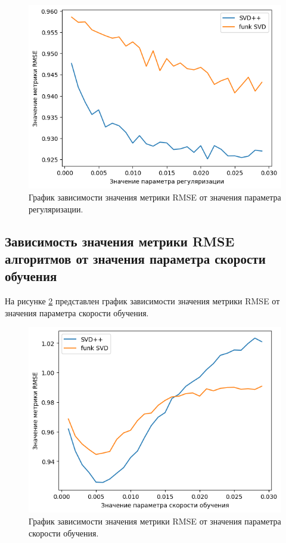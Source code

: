\begin{figure}[H]
	\centering
	\includegraphics[width=\textwidth]{inc/rmseReg.png}
	\caption{ График зависимости значения метрики RMSE от значения параметра регуляризации.}
	\label{img:time3}
\end{figure}

\subsection{Зависимость значения метрики RMSE алгоритмов от значения параметра скорости обучения}

На рисунке \ref{img:time4} представлен график зависимости значения метрики RMSE от значения параметра скорости обучения.

\begin{figure}[H]
	\centering
	\includegraphics[width=\textwidth]{inc/rmseLr.png}
	\caption{ График зависимости значения метрики RMSE от значения параметра скорости обучения.}
	\label{img:time4}
\end{figure}

